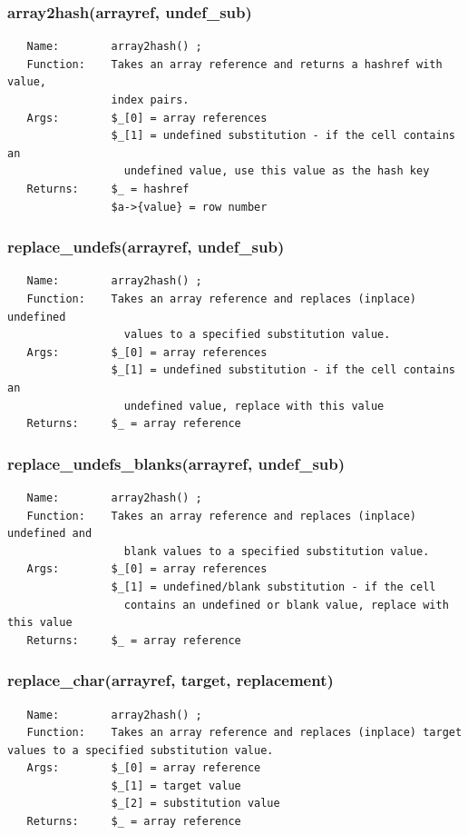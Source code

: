 \documentclass{article}
\begin{document}
\subsubsection*{array2hash(arrayref, undef\_sub)\label{pibase_pm_array2hash_arrayref_undef_sub_}}
\begin{verbatim}
   Name:        array2hash() ;
   Function:    Takes an array reference and returns a hashref with value,
                index pairs.
   Args:        $_[0] = array references
                $_[1] = undefined substitution - if the cell contains an
                  undefined value, use this value as the hash key
   Returns:     $_ = hashref
                $a->{value} = row number
\end{verbatim}
\subsubsection*{replace\_undefs(arrayref, undef\_sub)\label{pibase_pm_replace_undefs_arrayref_undef_sub_}}
\begin{verbatim}
   Name:        array2hash() ;
   Function:    Takes an array reference and replaces (inplace) undefined
                  values to a specified substitution value.
   Args:        $_[0] = array references
                $_[1] = undefined substitution - if the cell contains an
                  undefined value, replace with this value
   Returns:     $_ = array reference
\end{verbatim}
\subsubsection*{replace\_undefs\_blanks(arrayref, undef\_sub)\label{pibase_pm_replace_undefs_blanks_arrayref_undef_sub_}}
\begin{verbatim}
   Name:        array2hash() ;
   Function:    Takes an array reference and replaces (inplace) undefined and
                  blank values to a specified substitution value.
   Args:        $_[0] = array references
                $_[1] = undefined/blank substitution - if the cell
                  contains an undefined or blank value, replace with this value
   Returns:     $_ = array reference
\end{verbatim}
\subsubsection*{replace\_char(arrayref, target, replacement)\label{pibase_pm_replace_char_arrayref_target_replacement_}}
\begin{verbatim}
   Name:        array2hash() ;
   Function:    Takes an array reference and replaces (inplace) target values to a specified substitution value.
   Args:        $_[0] = array reference
                $_[1] = target value
                $_[2] = substitution value
   Returns:     $_ = array reference
\end{verbatim}
\end{document}
